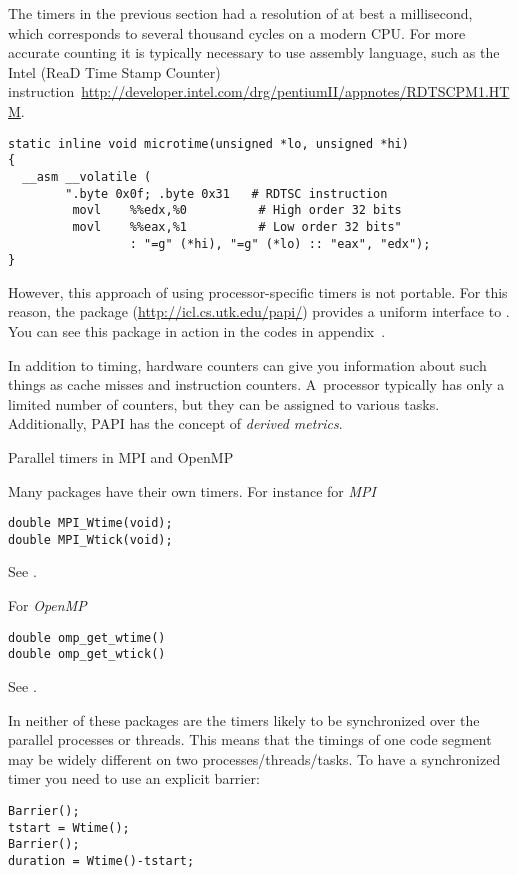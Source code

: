 The timers in the previous section had a resolution of at best a
millisecond, which corresponds to several thousand cycles on a modern
CPU. For more accurate counting it is typically necessary to use
assembly language, such as the Intel  (ReaD Time Stamp
Counter)
instruction~\url{http://developer.intel.com/drg/pentiumII/appnotes/RDTSCPM1.HTM}.
\begin{verbatim}
static inline void microtime(unsigned *lo, unsigned *hi)
{
  __asm __volatile (
        ".byte 0x0f; .byte 0x31   # RDTSC instruction
         movl    %%edx,%0          # High order 32 bits
         movl    %%eax,%1          # Low order 32 bits"
                 : "=g" (*hi), "=g" (*lo) :: "eax", "edx");
}                                                
\end{verbatim}
However,
this approach of using processor-specific timers is not portable. For
this reason, the  package (\url{http://icl.cs.utk.edu/papi/})
provides a uniform interface to .
You can see this package in action in the codes in
appendix~.

In addition to timing, hardware counters can give you information about 
such things as cache misses and instruction counters. A~processor typically
has only a limited number of counters, but they can be assigned to various tasks.
Additionally, PAPI has the concept of \emph{derived metrics}.

 {Parallel timers in MPI and OpenMP}

Many packages have their own timers. For instance for
\emph{MPI}
\begin{lstlisting}
double MPI_Wtime(void);
double MPI_Wtick(void);
\end{lstlisting}
See .

For
\emph{OpenMP}
\begin{lstlisting}
double omp_get_wtime()
double omp_get_wtick()
\end{lstlisting}
See .

In neither of these packages are the timers
likely to be synchronized over the
parallel processes or threads.
This means that the timings of one code segment may be widely different
on two processes/threads/tasks.
To have a synchronized timer you need
to use an explicit barrier:
\begin{lstlisting}
Barrier();
tstart = Wtime();
Barrier();
duration = Wtime()-tstart;
\end{lstlisting}

